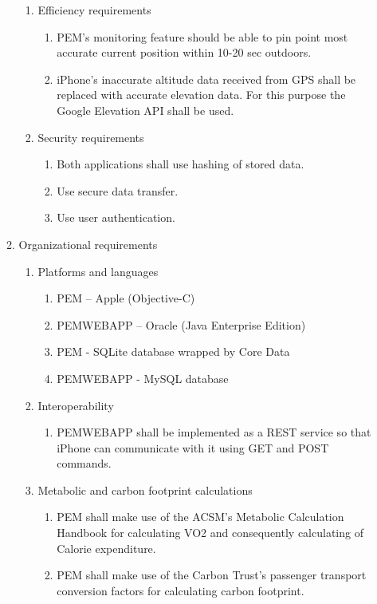 \documentclass[12pt, a4paper]{report}   %
\begin{document}
\begin{enumerate}
\begin{enumerate}
\begin{enumerate}
		\item Efficiency requirements
		\begin{enumerate}
			\item PEM's monitoring feature should be able to pin point most accurate current position within 10-20 sec outdoors.\\
			\item iPhone's inaccurate altitude data received from GPS shall be replaced with accurate elevation data. For this purpose the Google Elevation API shall be used.\\
		\end{enumerate}

		\item Security requirements
		\begin{enumerate}
			\item Both applications shall use hashing of stored data.
			\item Use secure data transfer.
			\item Use user authentication.\\
		\end{enumerate}
	\end{enumerate}

	\item Organizational requirements

		\begin{enumerate}
			\item Platforms and languages
			\begin{enumerate}
				\item PEM – Apple (Objective-C)
				\item PEMWEBAPP – Oracle (Java Enterprise Edition)
				\item PEM - SQLite database wrapped by Core Data
				\item PEMWEBAPP - MySQL database\\
			\end{enumerate}
			
			\item Interoperability
			\begin{enumerate}
				\item PEMWEBAPP shall be implemented as a REST service so that iPhone can communicate with it using GET and POST commands.\\
			\end{enumerate}

			\item Metabolic and carbon footprint calculations
			\begin{enumerate}
				\item PEM shall make use of the ACSM's Metabolic Calculation Handbook for calculating VO2 and consequently calculating of Calorie expenditure.
				\item PEM shall make use of the Carbon Trust's passenger transport conversion factors for calculating carbon footprint.\\
			\end{enumerate}
		\end{enumerate}
		

\end{enumerate}
\end{enumerate}
\end{document}
